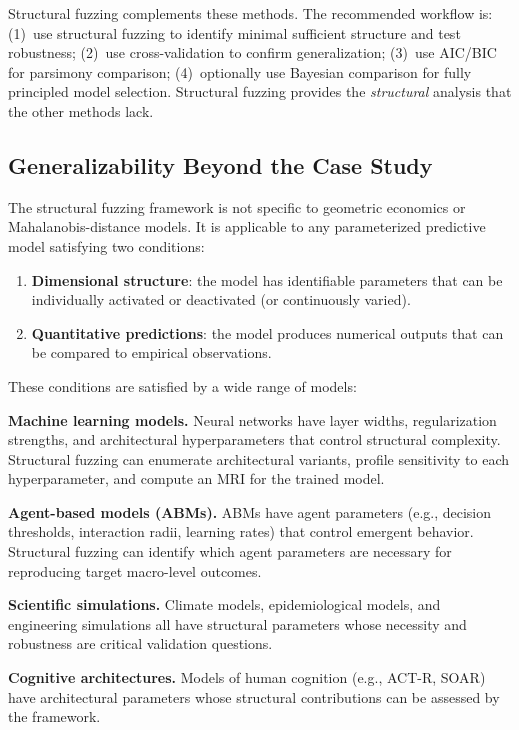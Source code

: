\documentclass[manuscript,review,anonymous]{acmart}
\begin{document}
Structural fuzzing complements these methods.
The recommended workflow is: (1)~use structural fuzzing to identify minimal sufficient structure and test robustness; (2)~use cross-validation to confirm generalization; (3)~use AIC/BIC for parsimony comparison; (4)~optionally use Bayesian comparison for fully principled model selection.
Structural fuzzing provides the \emph{structural} analysis that the other methods lack.

\subsection{Generalizability Beyond the Case Study}

The structural fuzzing framework is not specific to geometric economics or Mahalanobis-distance models.
It is applicable to any parameterized predictive model satisfying two conditions:

\begin{enumerate}
    \item \textbf{Dimensional structure}: the model has identifiable parameters that can be individually activated or deactivated (or continuously varied).
    \item \textbf{Quantitative predictions}: the model produces numerical outputs that can be compared to empirical observations.
\end{enumerate}

These conditions are satisfied by a wide range of models:

\textbf{Machine learning models.} Neural networks have layer widths, regularization strengths, and architectural hyperparameters that control structural complexity. Structural fuzzing can enumerate architectural variants, profile sensitivity to each hyperparameter, and compute an MRI for the trained model.

\textbf{Agent-based models (ABMs).} ABMs have agent parameters (e.g., decision thresholds, interaction radii, learning rates) that control emergent behavior. Structural fuzzing can identify which agent parameters are necessary for reproducing target macro-level outcomes.

\textbf{Scientific simulations.} Climate models, epidemiological models, and engineering simulations all have structural parameters whose necessity and robustness are critical validation questions.

\textbf{Cognitive architectures.} Models of human cognition (e.g., ACT-R, SOAR) have architectural parameters whose structural contributions can be assessed by the framework.
\end{document}
